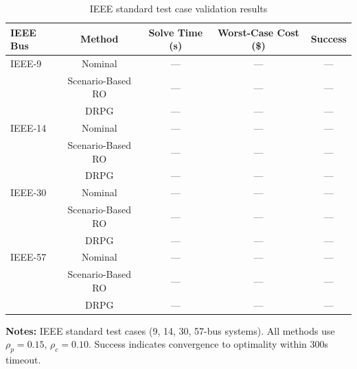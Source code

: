 \begin{table}[t]
\centering
\caption{IEEE standard test case validation results}
\label{tab:ieee_validation}
\begin{tabular}{l c c c c}
\toprule
IEEE Bus & Method & Solve Time (s) & Worst-Case Cost (\$) & Success \\
\midrule
IEEE-9 & Nominal & --- & --- & --- \\
 & Scenario-Based RO & --- & --- & --- \\
 & DRPG & --- & --- & --- \\
\midrule
IEEE-14 & Nominal & --- & --- & --- \\
 & Scenario-Based RO & --- & --- & --- \\
 & DRPG & --- & --- & --- \\
\midrule
IEEE-30 & Nominal & --- & --- & --- \\
 & Scenario-Based RO & --- & --- & --- \\
 & DRPG & --- & --- & --- \\
\midrule
IEEE-57 & Nominal & --- & --- & --- \\
 & Scenario-Based RO & --- & --- & --- \\
 & DRPG & --- & --- & --- \\
\midrule
\bottomrule
\end{tabular}
\vspace{2mm}
\footnotesize
\textbf{Notes:} IEEE standard test cases (9, 14, 30, 57-bus systems).
All methods use $\rho_p=0.15$, $\rho_c=0.10$.
Success indicates convergence to optimality within 300s timeout.
\end{table}
